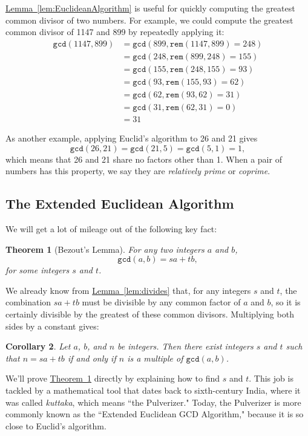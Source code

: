 \documentclass[11pt,oneside]{book}
\newtheorem{thm}{Theorem}[section]
\newtheorem{coro}[thm]{Corollary}
\theoremstyle{definition}
\begin{document}
\hyperref[lem:EuclideanAlgorithm]{Lemma~\ref*{lem:EuclideanAlgorithm}} is useful for quickly computing the greatest common divisor of two numbers.
For example, we could compute the greatest common divisor of 1147 and 899 by repeatedly applying it:
\begin{align*}
    \texttt{gcd}(1147, 899) &= \texttt{gcd}(899, \texttt{rem}(1147, 899) = 248) \\
    &= \texttt{gcd}(248, \texttt{rem}(899, 248) = 155) \\
    &= \texttt{gcd}(155, \texttt{rem}(248, 155) = 93) \\
    &= \texttt{gcd}(93, \texttt{rem}(155, 93) = 62) \\
    &= \texttt{gcd}(62, \texttt{rem}(93, 62) = 31) \\
    &= \texttt{gcd}(31, \texttt{rem}(62, 31) = 0) \\
    &= 31
\end{align*}

As another example, applying Euclid’s algorithm to 26 and 21 gives
\[ \texttt{gcd}(26, 21) = \texttt{gcd}(21, 5) = \texttt{gcd}(5, 1) = 1, \]
which means that 26 and 21 share no factors other than 1.
When a pair of numbers has this property, we say they are \emph{relatively prime} or \emph{coprime}.


\subsection{The Extended Euclidean Algorithm}
We will get a lot of mileage out of the following key fact:
\begin{thm}[Bezout's Lemma] \label{thm:Bezout}
    For any two integers $a$ and $b$,
    \[ \texttt{gcd}(a, b) = sa + tb, \]
    for some integers $s$ and $t$.
\end{thm}

We already know from \hyperref[lem:divides]{Lemma~\ref*{lem:divides}} that, for any integers $s$ and $t$, the combination $sa + tb$ must be divisible by any common factor of $a$ and $b$, so it is certainly divisible by the greatest of these common divisors.
Multiplying both sides by a constant gives:
\begin{coro}
    Let $a$, $b$, and $n$ be integers.
    Then there exist integers $s$ and $t$ such that $n = sa + tb$ if and only if $n$ is a multiple of $\texttt{gcd}(a, b)$.
\end{coro}

We'll prove \hyperref[thm:Bezout]{Theorem~\ref*{thm:Bezout}} directly by explaining how to find $s$ and $t$.
This job is tackled by a mathematical tool that dates back to sixth-century India, where it was called \emph{kuttaka}, which means ``the Pulverizer."
Today, the Pulverizer is more commonly known as the ``Extended Euclidean GCD Algorithm," because it is so close to Euclid's algorithm.
\end{document}

